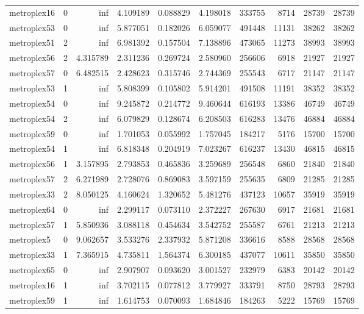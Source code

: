 \begin{longtable}{|l|r|r|r|r|r|r|r|r|r|}
metroplex16 & 0 & inf & 4.109189 & 0.088829 & 4.198018 & 333755 & 8714 & 28739 & 28739 \\
metroplex53 & 0 & inf & 5.877051 & 0.182026 & 6.059077 & 491448 & 11131 & 38262 & 38262 \\
metroplex51 & 2 & inf & 6.981392 & 0.157504 & 7.138896 & 473065 & 11273 & 38993 & 38993 \\
metroplex56 & 2 & 4.315789 & 2.311236 & 0.269724 & 2.580960 & 256606 & 6918 & 21927 & 21927 \\
metroplex57 & 0 & 6.482515 & 2.428623 & 0.315746 & 2.744369 & 255543 & 6717 & 21147 & 21147 \\
metroplex53 & 1 & inf & 5.808399 & 0.105802 & 5.914201 & 491508 & 11191 & 38352 & 38352 \\
metroplex54 & 0 & inf & 9.245872 & 0.214772 & 9.460644 & 616193 & 13386 & 46749 & 46749 \\
metroplex54 & 2 & inf & 6.079829 & 0.128674 & 6.208503 & 616283 & 13476 & 46884 & 46884 \\
metroplex59 & 0 & inf & 1.701053 & 0.055992 & 1.757045 & 184217 & 5176 & 15700 & 15700 \\
metroplex54 & 1 & inf & 6.818348 & 0.204919 & 7.023267 & 616237 & 13430 & 46815 & 46815 \\
metroplex56 & 1 & 3.157895 & 2.793853 & 0.465836 & 3.259689 & 256548 & 6860 & 21840 & 21840 \\
metroplex57 & 2 & 6.271989 & 2.728076 & 0.869083 & 3.597159 & 255635 & 6809 & 21285 & 21285 \\
metroplex33 & 2 & 8.050125 & 4.160624 & 1.320652 & 5.481276 & 437123 & 10657 & 35919 & 35919 \\
metroplex64 & 0 & inf & 2.299117 & 0.073110 & 2.372227 & 267630 & 6917 & 21681 & 21681 \\
metroplex57 & 1 & 5.850936 & 3.088118 & 0.454634 & 3.542752 & 255587 & 6761 & 21213 & 21213 \\
metroplex5 & 0 & 9.062657 & 3.533276 & 2.337932 & 5.871208 & 336616 & 8588 & 28568 & 28568 \\
metroplex33 & 1 & 7.365915 & 4.735811 & 1.564374 & 6.300185 & 437077 & 10611 & 35850 & 35850 \\
metroplex65 & 0 & inf & 2.907907 & 0.093620 & 3.001527 & 232979 & 6383 & 20142 & 20142 \\
metroplex16 & 1 & inf & 3.702115 & 0.077812 & 3.779927 & 333791 & 8750 & 28793 & 28793 \\
metroplex59 & 1 & inf & 1.614753 & 0.070093 & 1.684846 & 184263 & 5222 & 15769 & 15769 \\

\end{longtable}

